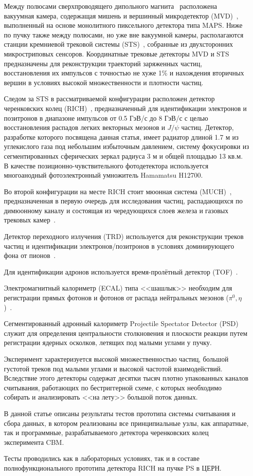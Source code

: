 Между полюсами сверхпроводящего дипольного магнита~\cite{TDR_Magnet} расположена вакуумная камера, содержащая мишень и вершинный микродетектор (MVD)~\cite{MVD_KOZIEL}, выполненный на основе монолитного пиксельного детектора типа MAPS. Ниже по пучку также между полюсами, но уже вне вакуумной камеры, располагаются станции кремниевой трековой системы (STS)~\cite{TDR_STS}, собранные из двухсторонних микростриповых сенсоров. Координатные трековые детекторы MVD и STS предназначены для реконструкции траекторий заряженных частиц, восстановления их импульсов с точностью не хуже 1\% и нахождения вторичных вершин в условиях высокой множественности и плотности частиц.

Следом за STS в рассматриваемой конфигурации расположен детектор черенковских колец (RICH)~\cite{TDR_RICH}, предназначенный для идентификации электронов и позитронов в диапазоне импульсов от 0.5 ГэВ/с до 8 ГэВ/с с целью восстановления распадов легких векторных мезонов и $ J / \psi $ частиц. Детектор, разработке которого посвящена данная статья, имеет радиатор длиной 1.7 м из углекислого газа под небольшим избыточным давлением, систему фокусировки из сегментированных сферических зеркал радиуса 3 м и общей площадью 13 кв.м. В качестве позиционно-чувствительного фотодетектора используется многоанодный фотоэлектронный умножитель Hamamatsu H12700.

Во второй конфигурации на месте RICH стоит мюонная система (MUCH)~\cite{TDR_MUCH}, предназначенная в первую очередь для исследования частиц, распадающихся по димюонному каналу и состоящая из чередующихся слоев железа и газовых трековых камер~\cite{GEM}.

Детектор переходного излучения (TRD) используется для реконструкции треков частиц и идентификации электронов/позитронов в условиях доминирующего фона от пионов~\cite{TRD}.

Для идентификации адронов используется время-пролётный детектор (TOF)~\cite{TDR_TOF}.

Электромагнитный калориметр (ECAL) типа <<шашлык>> необходим для регистрации прямых фотонов и фотонов от распада нейтральных мезонов ($ \pi^{0}, \eta $)~\cite{ECAL_KOROLKO}.

Сегментированный адронный калориметр Projectile Spectator Detector (PSD)~\cite{TDR_PSD} служит для определения центральности столкновения и плоскости реакции путем регистрации ядерных осколков, летящих под малыми углами у пучку.

Эксперимент характеризуется высокой множественностью частиц, большой густотой треков под малыми углами и высокой частотой взаимодействий. Вследствие этого детекторы содержат десятки тысяч плотно упакованных каналов считывания, работающих по бестриггерной схеме, с которых необходимо собирать и анализировать <<на лету>> большой поток данных.

В данной статье описаны результаты тестов прототипа системы считывания и сбора данных, в котором реализованы все принципиальные узлы, как аппаратные, так и программные, разрабатываемого детектора черенковских колец эксперимента CBM.

Тесты проводились как в лабораторных условиях, так и в составе полнофункционального прототипа детектора RICH на пучке PS в ЦЕРН.
